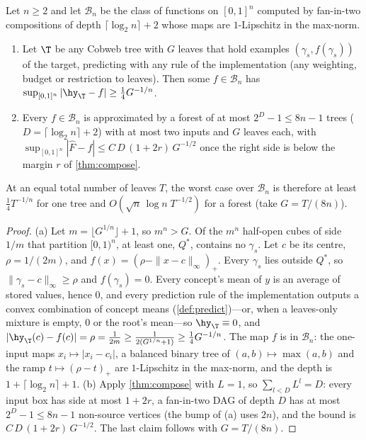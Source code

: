 \begin{theorem}[Separation]\label{thm:separation}
Let $n\ge2$ and let $\mathcal B_n$ be the class of functions on $[0,1]^n$ computed by fan-in-two
compositions of depth $\lceil\log_2n\rceil+2$ whose maps are $1$-Lipschitz in the max-norm.
\begin{enumerate}[label=(\alph*),leftmargin=*,noitemsep]
\item Let $\T$ be any Cobweb tree with $G$ leaves that hold examples $(\gamma_s,f(\gamma_s))$ of the
  target, predicting with any rule of the implementation (any weighting, budget or
  restriction to leaves).  Then some $f\in\mathcal B_n$ has $\sup_{[0,1]^n}|\hy_\T-f|\ge
  \tfrac14G^{-1/n}$.
\item Every $f\in\mathcal B_n$ is approximated by a forest of at most $2^D-1\le8n-1$ trees
  ($D=\lceil\log_2n\rceil+2$) with at most two inputs and $G$ leaves each, with
  $\sup_{[0,1]^n}|\hat F-f|\le C\,D\,(1+2r)\,G^{-1/2}$ once the right side is below the margin $r$
  of \cref{thm:compose}.
\end{enumerate}
At an equal total number of leaves $T$, the worst case over $\mathcal B_n$ is therefore at least
$\tfrac14T^{-1/n}$ for one tree and $O(\sqrt n\,\log n\;T^{-1/2})$ for a forest (take $G=T/(8n)$).
\end{theorem}

\begin{proof}
(a) Let $m=\lfloor G^{1/n}\rfloor+1$, so $m^n>G$.  Of the $m^n$ half-open cubes of side $1/m$ that
partition $[0,1)^n$, at least one, $Q^*$, contains no $\gamma_s$.  Let $c$ be its centre,
$\rho=1/(2m)$, and $f(x)=(\rho-\|x-c\|_\infty)_+$.  Every $\gamma_s$ lies outside $Q^*$, so
$\|\gamma_s-c\|_\infty\ge\rho$ and $f(\gamma_s)=0$.  Every concept's mean of $y$ is an average of
stored values, hence $0$, and every prediction rule of the implementation outputs a convex
combination of concept means (\cref{def:predict})---or, when a leaves-only mixture is empty,
$0$ or the root's mean---so $\hy_\T\equiv0$, and
$|\hy_\T(c)-f(c)|=\rho=\frac1{2m}\ge\frac1{2(G^{1/n}+1)}\ge\frac14G^{-1/n}$.  The map $f$ is in
$\mathcal B_n$: the one-input maps $x_i\mapsto|x_i-c_i|$, a balanced binary tree of
$(a,b)\mapsto\max(a,b)$ and the ramp $t\mapsto(\rho-t)_+$ are $1$-Lipschitz in the max-norm, and
the depth is $1+\lceil\log_2n\rceil+1$.
(b) Apply \cref{thm:compose} with $L=1$, so $\sum_{l<D}L^l=D$: every input box has side at most
$1+2r$, a fan-in-two DAG of depth $D$ has at most $2^D-1\le8n-1$ non-source vertices (the
bump of (a) uses $2n$), and the bound is $C\,D\,(1+2r)\,G^{-1/2}$.  The last claim follows with
$G=T/(8n)$.
\end{proof}


